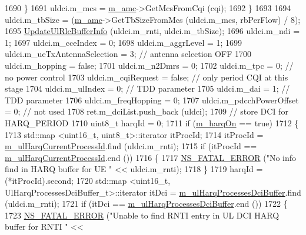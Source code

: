 \begin{DoxyCode}
1690             \}
1691           uldci.m\_mcs = \hyperlink{classns3_1_1FdMtFfMacScheduler_a243eae6fea006597039d90bc727786eb}{m\_amc}->GetMcsFromCqi (cqi);
1692         \}
1693 
1694       uldci.m\_tbSize = (\hyperlink{classns3_1_1FdMtFfMacScheduler_a243eae6fea006597039d90bc727786eb}{m\_amc}->GetTbSizeFromMcs (uldci.m\_mcs, rbPerFlow) / 8);
1695       \hyperlink{classns3_1_1FdMtFfMacScheduler_af015295a34b7dac6aa23e22a38319c38}{UpdateUlRlcBufferInfo} (uldci.m\_rnti, uldci.m\_tbSize);
1696       uldci.m\_ndi = 1;
1697       uldci.m\_cceIndex = 0;
1698       uldci.m\_aggrLevel = 1;
1699       uldci.m\_ueTxAntennaSelection = 3; \textcolor{comment}{// antenna selection OFF}
1700       uldci.m\_hopping = \textcolor{keyword}{false};
1701       uldci.m\_n2Dmrs = 0;
1702       uldci.m\_tpc = 0; \textcolor{comment}{// no power control}
1703       uldci.m\_cqiRequest = \textcolor{keyword}{false}; \textcolor{comment}{// only period CQI at this stage}
1704       uldci.m\_ulIndex = 0; \textcolor{comment}{// TDD parameter}
1705       uldci.m\_dai = 1; \textcolor{comment}{// TDD parameter}
1706       uldci.m\_freqHopping = 0;
1707       uldci.m\_pdcchPowerOffset = 0; \textcolor{comment}{// not used}
1708       ret.m\_dciList.push\_back (uldci);
1709       \textcolor{comment}{// store DCI for HARQ\_PERIOD}
1710       uint8\_t harqId = 0;
1711       \textcolor{keywordflow}{if} (\hyperlink{classns3_1_1FdMtFfMacScheduler_abc95b8f62ff797ff3fb9ed21322c5f35}{m\_harqOn} == \textcolor{keyword}{true})
1712         \{
1713           std::map <uint16\_t, uint8\_t>::iterator itProcId;
1714           itProcId = \hyperlink{classns3_1_1FdMtFfMacScheduler_abdac9ae7be0c9b938eebf34dfb2f5126}{m\_ulHarqCurrentProcessId}.find (uldci.m\_rnti);
1715           \textcolor{keywordflow}{if} (itProcId == \hyperlink{classns3_1_1FdMtFfMacScheduler_abdac9ae7be0c9b938eebf34dfb2f5126}{m\_ulHarqCurrentProcessId}.end ())
1716             \{
1717               \hyperlink{group__fatal_ga5131d5e3f75d7d4cbfd706ac456fdc85}{NS\_FATAL\_ERROR} (\textcolor{stringliteral}{"No info find in HARQ buffer for UE "} << uldci.m\_rnti);
1718             \}
1719           harqId = (*itProcId).second;
1720           std::map <uint16\_t, UlHarqProcessesDciBuffer\_t>::iterator itDci = 
      \hyperlink{classns3_1_1FdMtFfMacScheduler_a43c0d140a807beae5125340c8df8dcdd}{m\_ulHarqProcessesDciBuffer}.find (uldci.m\_rnti);
1721           \textcolor{keywordflow}{if} (itDci == \hyperlink{classns3_1_1FdMtFfMacScheduler_a43c0d140a807beae5125340c8df8dcdd}{m\_ulHarqProcessesDciBuffer}.end ())
1722             \{
1723               \hyperlink{group__fatal_ga5131d5e3f75d7d4cbfd706ac456fdc85}{NS\_FATAL\_ERROR} (\textcolor{stringliteral}{"Unable to find RNTI entry in UL DCI HARQ buffer for RNTI "} << 

\end{DoxyCode}

